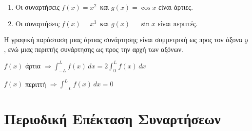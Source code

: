 \begin{examples}
\item {}
  \begin{enumerate}
    \item Οι συναρτήσεις $ f(x)=x^{2} $ και $ g(x)= \cos x $ είναι άρτιες.
    \item Οι συναρτήσεις $ f(x)=x^{3} $ και $ g(x)= \sin x $ είναι περιττές.
  \end{enumerate}
\end{examples}

\begin{rem}
  Η γραφική παράσταση μιας άρτιας συνάρτησης είναι συμμετρική ως προς τον άξονα $y$, 
  ενώ μιας περιττής συνάρτησης ως προς την αρχή των αξόνων.
\end{rem}

\begin{prop}
\item {}
  \begin{myitemize*}
    \item $ f(x) $ άρτια $ \Rightarrow \int _{-L}^{L} f(x) \,{dx} = 2 \int _{0}^{L} f(x)
      \,{dx} $ 
    \item $ f(x) $ περιττή $ \Rightarrow \int _{-L}^{L} f(x) \,{dx} = 0 $
  \end{myitemize*}
\end{prop}

\section{Περιοδική Επέκταση Συναρτήσεων}

\vspace{\baselineskip}

